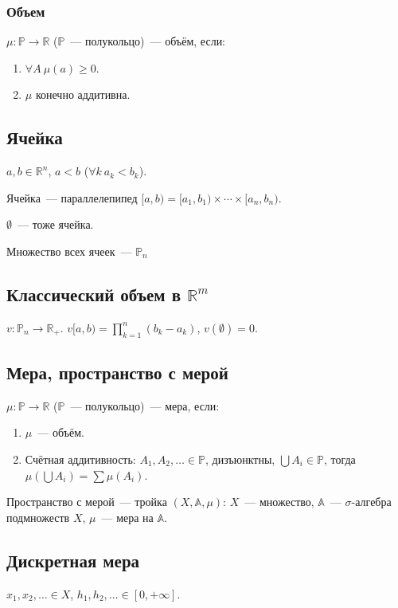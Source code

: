 \documentclass[paper=a4, fontsize=11pt]{article}
\begin{document}
\subsubsection{Объем}
$\mu: \mathds{P} \rightarrow \mathds{R}$ ($\mathds{P}$~--- полукольцо)~--- объём, если:
\begin{enumerate}
    \item $\forall A\ \mu(a) \geq 0$.
    \item $\mu$ конечно аддитивна.
\end{enumerate}

\subsection{Ячейка}
$a, b \in \mathds{R}^n$, $a < b$ ($\forall k\ a_k < b_k$).

Ячейка~--- параллелепипед $[a,b) = [a_1,b_1) \times \cdots \times [a_n,b_n)$.

$\emptyset$~--- тоже ячейка.

Множество всех ячеек~--- $\mathds{P}_n$

\subsection{Классический объем в $\mathds{R}^m$}
$v: \mathds{P}_n \rightarrow \mathds{R}_+$. $v[a,b) = \prod_{k=1}^n (b_k-a_k)$, $v(\emptyset) = 0$.

\subsection{Мера, пространство с мерой}
$\mu: \mathds{P} \rightarrow \mathds{R}$ ($\mathds{P}$~--- полукольцо)~--- мера, если:
\begin{enumerate}
    \item $\mu$~--- объём.
    \item Счётная аддитивность:
    $A_1,A_2,\dots \in \mathds{P}$, дизъюнктны, $\bigcup A_i \in \mathds{P}$, тогда $\mu(\bigcup A_i) = \sum \mu(A_i)$.
\end{enumerate}
Пространство с мерой~--- тройка $(X,\mathds{A},\mu)$:
$X$~--- множество, $\mathds{A}$~--- $\sigma$-алгебра подмножеств $X$, $\mu$~--- мера на $\mathds{A}$.

\subsection{Дискретная мера}
$x_1,x_2,\dots \in X$, $h_1,h_2,\dots \in [0,+\infty]$.
\end{document}
